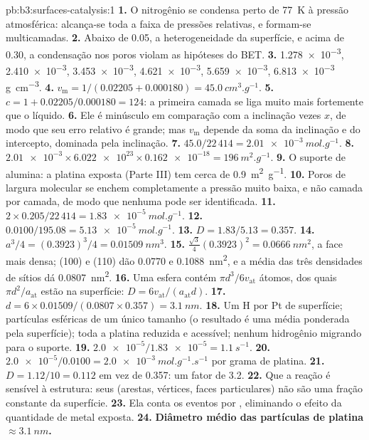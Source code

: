 \begin{solution}{pb:b3:surfaces-catalysis:1}
\textbf{1.} O nitrogênio se condensa perto de \qty{77}{K} à pressão atmosférica: alcança-se
toda a faixa de pressões relativas, e formam-se multicamadas.
\textbf{2.} Abaixo de 0.05, a heterogeneidade da superfície, e acima de 0.30, a
condensação nos poros violam as hipóteses do BET.
\textbf{3.} \num{1.278e-3}, \num{2.410e-3}, \num{3.453e-3}, \num{4.621e-3}, \num{5.659e-3}, \num{6.813e-3} \unit{g.cm^{-3}}.
\textbf{4.} $v_{\mathrm m} = 1/(0.02205 + 0.000180) = \qty{45.0}{cm^3.g^{-1}}$.
\textbf{5.} $c = 1 + 0.02205/0.000180 = 124$: a primeira camada se liga muito mais
fortemente que o líquido.
\textbf{6.} Ele é minúsculo em comparação com a inclinação vezes $x$, de modo que seu erro
relativo é grande; mas $v_{\mathrm m}$ depende da soma da inclinação e do intercepto, dominada
pela inclinação.
\textbf{7.} $45.0/22\,414 = \qty{2.01e-3}{mol.g^{-1}}$.
\textbf{8.} $\num{2.01e-3} \times \num{6.022e23} \times \num{0.162e-18} = \qty{196}{m^2.g^{-1}}$.
\textbf{9.} O suporte de alumina: a platina exposta (Parte III) tem cerca de \qty{0.9}{m^2.g^{-1}}.
\textbf{10.} Poros de largura molecular se enchem completamente a pressão muito baixa,
e não camada por camada, de modo que nenhuma  pode ser identificada.
\textbf{11.} $2 \times 0.205/22\,414 = \qty{1.83e-5}{mol.g^{-1}}$.
\textbf{12.} $0.0100/195.08 = \qty{5.13e-5}{mol.g^{-1}}$.
\textbf{13.} $D = 1.83/5.13 = 0.357$.
\textbf{14.} $a^3/4 = (0.3923)^3/4 = \qty{0.01509}{nm^3}$.
\textbf{15.} $\frac{\sqrt3}{4}(0.3923)^2 = \qty{0.0666}{nm^2}$, a face mais densa; (100) e (110) dão 0.0770 e
\qty{0.1088}{nm^2}, e a média das três densidades de sítios dá \qty{0.0807}{nm^2}.
\textbf{16.} Uma esfera contém $\pi d^3/6v_{\mathrm{at}}$ átomos, dos quais $\pi d^2/a_{\mathrm{at}}$ estão na superfície:
$D = 6v_{\mathrm{at}}/(a_{\mathrm{at}}d)$.
\textbf{17.} $d = 6 \times 0.01509/(0.0807 \times 0.357) = \qty{3.1}{nm}$.
\textbf{18.} Um H por Pt de superfície; partículas esféricas de um único tamanho (o
resultado é uma média ponderada pela superfície); toda a platina reduzida e acessível;
nenhum hidrogênio migrando para o suporte.
\textbf{19.} $\num{2.0e-5}/\num{1.83e-5} = \qty{1.1}{s^{-1}}$.
\textbf{20.} $\num{2.0e-5}/0.0100 = \qty{2.0e-3}{mol.g^{-1}.s^{-1}}$ por grama de platina.
\textbf{21.} $D = 1.12/10 = 0.112$ em vez de 0.357: um fator de 3.2.
\textbf{22.} Que a reação é sensível à estrutura: seus  (arestas, vértices,
faces particulares) não são uma fração constante da superfície.
\textbf{23.} Ela conta os eventos por , eliminando o efeito da quantidade de
metal exposta.
\textbf{24.} \textbf{Diâmetro médio das partículas de platina $\approx \qty{3.1}{nm}$.}
\end{solution}
